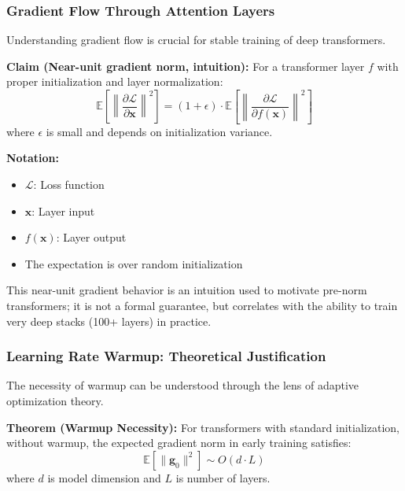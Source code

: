 \subsubsection{Gradient Flow Through Attention Layers}

Understanding gradient flow is crucial for stable training of deep transformers.

\textbf{Claim (Near-unit gradient norm, intuition):} For a transformer layer $f$ with proper initialization and layer normalization:
\begin{equation}
\mathbb{E}\left[\left\|\frac{\partial \mathcal{L}}{\partial \mathbf{x}}\right\|^2\right] = (1 + \epsilon) \cdot \mathbb{E}\left[\left\|\frac{\partial \mathcal{L}}{\partial f(\mathbf{x})}\right\|^2\right]
\end{equation}
where $\epsilon$ is small and depends on initialization variance.

\begin{notationbox}
\textbf{Notation:}
\begin{itemize}
    \item $\mathcal{L}$: Loss function
    \item $\mathbf{x}$: Layer input
    \item $f(\mathbf{x})$: Layer output
    \item The expectation is over random initialization
\end{itemize}
\end{notationbox}

This near-unit gradient behavior is an intuition used to motivate pre-norm transformers; it is not a formal guarantee, but correlates with the ability to train very deep stacks (100+ layers) in practice.

\subsubsection{Learning Rate Warmup: Theoretical Justification}

The necessity of warmup can be understood through the lens of adaptive optimization theory.

\textbf{Theorem (Warmup Necessity):} For transformers with standard initialization, without warmup, the expected gradient norm in early training satisfies:
\begin{equation}
\mathbb{E}[\|\mathbf{g}_0\|^2] \sim O(d \cdot L)
\end{equation}
where $d$ is model dimension and $L$ is number of layers.

